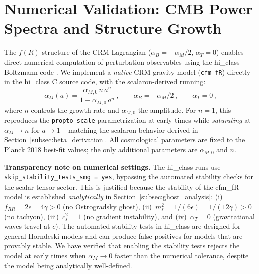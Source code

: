 \documentclass[aps,prd,twocolumn,superscriptaddress,nofootinbib]{revtex4-2}
\begin{document}
\section{Numerical Validation: CMB Power Spectra and Structure Growth}
\label{sec:numerical}

The $f(R)$ structure of the CRM Lagrangian ($\alpha_B = -\alpha_M/2$, $\alpha_T = 0$) enables direct numerical computation of perturbation observables using the hi\_class Boltzmann code \cite{Zumalacarregui2017}. We implement a \textit{native} CRM gravity model (\texttt{cfm\_fR}) directly in the hi\_class C source code, with the scalaron-derived running:
\begin{equation}
\alpha_M(a) = \frac{\alpha_{M,0}\,n\,a^n}{1 + \alpha_{M,0}\,a^n}\,, \qquad \alpha_B = -\alpha_M/2\,, \qquad \alpha_T = 0\,,
\label{eq:cfm_fR_alpha}
\end{equation}
where $n$ controls the growth rate and $\alpha_{M,0}$ the amplitude. For $n = 1$, this reproduces the \texttt{propto\_scale} parametrization at early times while \textit{saturating} at $\alpha_M \to n$ for $a \to 1$ -- matching the scalaron behavior derived in Section~\ref{subsec:beta_derivation}. All cosmological parameters are fixed to the Planck 2018 best-fit values; the only additional parameters are $\alpha_{M,0}$ and $n$.

\textbf{Transparency note on numerical settings.} The hi\_class runs use \texttt{skip\_stability\_tests\_smg = yes}, bypassing the automated stability checks for the scalar-tensor sector. This is justified because the stability of the cfm\_fR model is established \textit{analytically} in Section~\ref{subsec:ghost_analysis}: (i)~$f_{RR} = 2\epsilon = 4\gamma > 0$ (no Ostrogradsky ghost), (ii)~$m_s^2 = 1/(6\epsilon) = 1/(12\gamma) > 0$ (no tachyon), (iii)~$c_s^2 = 1$ (no gradient instability), and (iv)~$\alpha_T = 0$ (gravitational waves travel at $c$). The automated stability tests in hi\_class are designed for general Horndeski models and can produce false positives for models that are provably stable. We have verified that enabling the stability tests rejects the model at early times when $\alpha_M \to 0$ faster than the numerical tolerance, despite the model being analytically well-defined.
\end{document}
